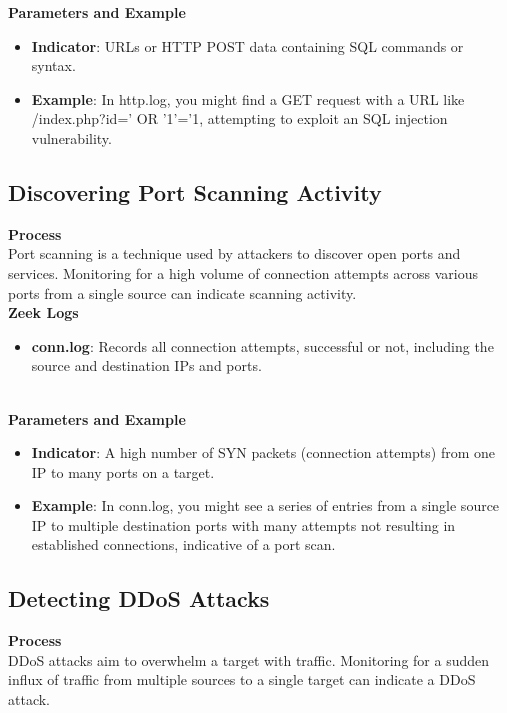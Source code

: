 \noindent \textbf{Parameters and Example}
\begin{itemize}
    \item \textbf{Indicator}: URLs or HTTP POST data containing SQL commands or syntax.
    \item \textbf{Example}: In http.log, you might find a GET request with a URL like /index.php?id=' OR '1'='1, attempting to exploit an SQL injection vulnerability.
\end{itemize}

\vspace{8pt}
\subsection{Discovering Port Scanning Activity}
\textbf{Process}
\vspace{8pt}
\\
Port scanning is a technique used by attackers to discover open ports and services. Monitoring for a high volume of connection attempts across various ports from a single source can indicate scanning activity.
\vspace{10pt}
\\

\noindent \textbf{Zeek Logs}
\begin{itemize}
    \item \textbf{conn.log}: Records all connection attempts, successful or not, including the source and destination IPs and ports.
\end{itemize}
\vspace{10pt}
\\

\noindent \textbf{Parameters and Example}
\begin{itemize}
    \item \textbf{Indicator}: A high number of SYN packets (connection attempts) from one IP to many ports on a target.
    \item \textbf{Example}: In conn.log, you might see a series of entries from a single source IP to multiple destination ports with many attempts not resulting in established connections, indicative of a port scan.
\end{itemize}

\vspace{8pt}
\subsection{Detecting DDoS Attacks}
\textbf{Process}
\vspace{8pt}
\\
DDoS attacks aim to overwhelm a target with traffic. Monitoring for a sudden influx of traffic from multiple sources to a single target can indicate a DDoS attack.
\vspace{10pt}
\\

